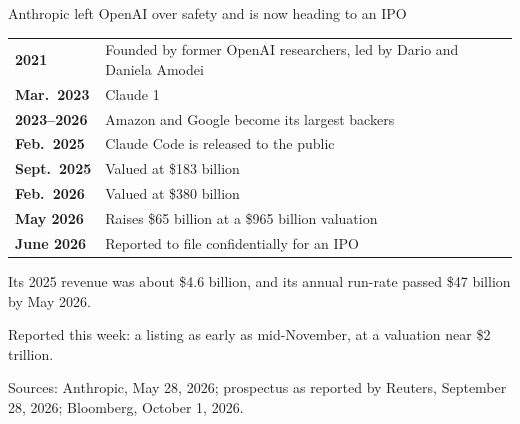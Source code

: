 \documentclass[aspectratio=169,11pt]{beamer}
\begin{document}
\begin{frame}{Anthropic left OpenAI over safety and is now heading to an IPO}

\begin{center}
\footnotesize
\begin{tabular}{@{}ll@{}}
\toprule
\textbf{2021} & Founded by former OpenAI researchers, led by Dario and Daniela Amodei \\
\textbf{Mar.\ 2023} & Claude 1 \\
\textbf{2023--2026} & Amazon and Google become its largest backers \\
\textbf{Feb.\ 2025} & Claude Code is released to the public \\
\textbf{Sept.\ 2025} & Valued at \$183 billion \\
\textbf{Feb.\ 2026} & Valued at \$380 billion \\
\textbf{May 2026} & Raises \$65 billion at a \$965 billion valuation \\
\textbf{June 2026} & Reported to file confidentially for an IPO \\
\bottomrule
\end{tabular}
\end{center}

\vspace{0.3cm}

Its 2025 revenue was about \$4.6 billion, and its annual run-rate passed \$47 billion by May 2026.

\vspace{0.25cm}

\alert{Reported this week: a listing as early as mid-November, at a valuation near \$2 trillion.}

\vspace{0.1cm}
{\scriptsize\color{warmgray}Sources: Anthropic, May 28, 2026; prospectus as reported by Reuters, September 28, 2026; Bloomberg, October 1, 2026.}

\end{frame}

\end{document}
